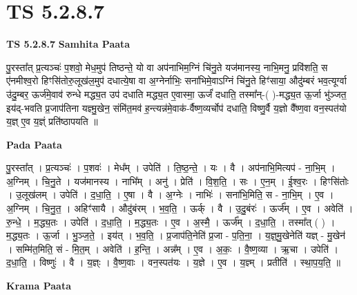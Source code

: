 \documentclass[17pt]{extarticle}
\begin{document}
\section{ TS 5.2.8.7 }

\textbf{TS 5.2.8.7 } \newline
\textbf{Samhita Paata} \newline

पु॒रस्ता᳚त् प्र॒त्यञ्चः॑ प॒शवो॒ मेध॒मुप॑ तिष्ठन्ते॒ यो वा अप॑नाभिम॒ग्निं चि॑नु॒ते यज॑मानस्य॒ नाभि॒मनु॒ प्रवि॑शति॒ स ए॑नमीश्व॒रो हिꣳसि॑तोरु॒लूख॑ल॒मुप॑ दधात्ये॒षा वा अ॒ग्नेर्नाभिः॒ सना॑भिमे॒वाऽग्निं चि॑नु॒ते हिꣳ॑साया॒ औदु॑म्बरं भव॒त्यूर्ग्वा उ॑दु॒म्बर॒ ऊर्ज॑मे॒वाव॑ रुन्धे मद्ध्य॒त उप॑ दधाति मद्ध्य॒त ए॒वास्मा॒ ऊर्जं॑ दधाति॒ तस्मा᳚न्-( )-मद्ध्य॒त ऊ॒र्जा भु॑ञ्जत॒ इय॑द्-भवति प्र॒जाप॑तिना यज्ञ्मु॒खेन॒ संमि॑त॒मव॑ ह॒न्त्यन्न॑मे॒वाक॑-र्वैष्ण॒व्यर्चोप॑ दधाति॒ विष्णु॒र्वै य॒ज्ञो वै᳚ष्ण॒वा वन॒स्पत॑यो य॒ज्ञ् ए॒व य॒ज्ञ्ं प्रति॑ष्ठापयति ॥ \newline

\textbf{Pada Paata} \newline

पु॒रस्ता᳚त् । प्र॒त्यञ्चः॑ । प॒शवः॑ । मेध᳚म् । उपेति॑ । ति॒ष्ठ॒न्ते॒ । यः । वै । अप॑नाभि॒मित्यप॑ - ना॒भि॒म् । अ॒ग्निम् । चि॒नु॒ते । यज॑मानस्य । नाभि᳚म् । अनु॑ । प्रेति॑ । वि॒श॒ति॒ । सः । ए॒न॒म् । ई॒श्व॒रः । हिꣳसि॑तोः । उ॒लूख॑लम् । उपेति॑ । द॒धा॒ति॒ । ए॒षा । वै । अ॒ग्नेः । नाभिः॑ । सना॑भि॒मिति॒ स - ना॒भि॒म् । ए॒व । अ॒ग्निम् । चि॒नु॒त॒ । अहिꣳ॑सायै । औदु॑बंरम् । भ॒व॒ति॒ । ऊर्क् । वै । उ॒दु॒बंरः॑ । ऊर्ज᳚म् । ए॒व । अवेति॑ । रु॒न्धे॒ । म॒द्ध्य॒तः । उपेति॑ । द॒धा॒ति॒ । म॒द्ध्य॒तः । ए॒व । अ॒स्मै॒ । ऊर्ज᳚म् । द॒धा॒ति॒ । तस्मा᳚त् ( ) । म॒द्ध्य॒तः । ऊ॒र्जा । भु॒ञ्ज॒ते॒ । इय॑त् । भ॒व॒ति॒ । प्र॒जाप॑ति॒नेति॑ प्र॒जा - प॒ति॒ना॒ । य॒ज्ञ्॒मु॒खेनेति॑ यज्ञ् - मु॒खेन॑ । सम्मि॑त॒मिति॒ सं - मि॒त॒म् । अवेति॑ । ह॒न्ति॒ । अन्न᳚म् । ए॒व । अ॒कः॒ । वै॒ष्ण॒व्या । ऋ॒चा । उपेति॑ । द॒धा॒ति॒ । विष्णुः॑ । वै । य॒ज्ञ्ः । वै॒ष्ण॒वाः । वन॒स्पत॑यः । य॒ज्ञे । ए॒व । य॒ज्ञ्म् । प्रतीति॑ । स्था॒प॒य॒ति॒ ॥  \newline


\textbf{Krama Paata} \newline
\end{document}
